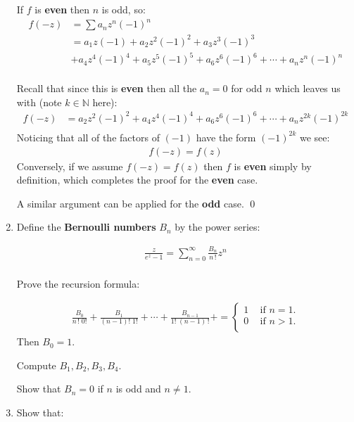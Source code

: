 \begin{enumerate}
  If $f$ is \textbf{even} then $n$ is odd, so:
  \begin{align*}
    f(-z) &= \sum a_n z^n (-1)^n \\
    &= a_1 z (-1) + a_2 z^2 (-1)^2 + a_3 z^3 (-1)^3 \\
    &+ a_4 z^4 (-1)^4 + a_5 z^5 (-1)^5 + a_6 z^6 (-1)^6 + \cdots + a_n z^n (-1)^n \\
  \end{align*}

  Recall that since this is \textbf{even} then all the $a_n = 0$ for odd $n$ which leaves us with (note $k \in \mathbb{N}$ here):
  \begin{align*}
    f(-z) &= a_2 z^2 (-1)^2 + a_4 z^4 (-1)^4 + a_6 z^6 (-1)^6 + \cdots + a_n z^{2k} (-1)^{2k} \\
  \end{align*} 
  Noticing that all of the factors of $(-1)$ have the form $(-1)^{2k}$ we see:
  \begin{align*}
    f(-z) = f(z)
  \end{align*}
  Conversely, if we assume $f(-z) = f(z)$ then $f$ is \textbf{even} simply by definition, which completes the proof 
  for the \textbf{even} case. 
  
  A similar argument can be applied for the \textbf{odd} case.
  \qed

  \item Define the \textbf{Bernoulli numbers} $B_n$ by the power series:

  \begin{align*}
    \frac{z}{e^z - 1} = \sum_{n = 0}^{\infty}\frac{B_n}{n\,!}z^n \\
  \end{align*}

  Prove the recursion formula:

  \begin{align*}
    \frac{B_0}{n \, ! \; 0!} + \frac{B_1}{(n - 1)! \; 1!} + \cdots + \frac{B_{n - 1}}{1! \; (n - 1)\,!} + = 
    \begin{cases}
      1 \;\;\; \text{   if } n = 1. \\
      0 \;\;\; \text{   if } n > 1. \\
    \end{cases}
  \end{align*}
  Then $B_0 = 1.$
  
  Compute $B_1, B_2, B_3, B_4.$
  
  Show that $B_n = 0$ if $n$ is odd and $n \not = 1.$
  
  \item Show that:


\end{enumerate}

